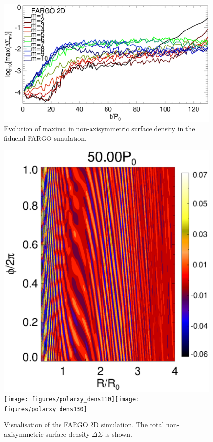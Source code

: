 \begin{figure}
  \includegraphics[width=\linewidth]{figures/nonaxi_evol_DZ_fargo}
  \caption{Evolution of maxima in non-axisymmetric surface density 
    in the fiducial FARGO simulation.\label{fargo_modeamp}} 
\end{figure}

\begin{figure}
  \includegraphics[scale=0.27]{figures/polarxy_dens050}\texttt{[image: figures/polarxy\_dens110]}\texttt{[image: figures/polarxy\_dens130]} 
  \caption{Visualisation of the FARGO 2D simulation. The total  
    non-axisymmetric surface density
    $\Delta\Sigma$ is shown. \label{fargo_2d}} 
\end{figure}

